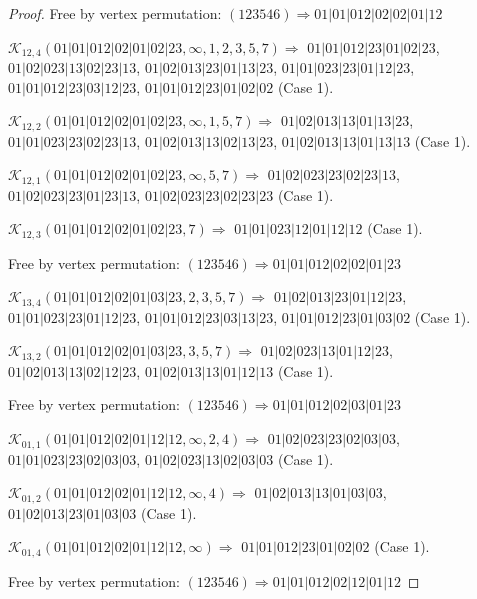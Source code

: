 \documentclass[12pt]{article}
\theoremstyle{plain}
\theoremstyle{definition}
\theoremstyle{remark}
\newcommand{\fancy}[1]{\mathcal{#1}}
\def\K{\fancy{K}}
\begin{document}
\begin{proof}
	
	
	Free by vertex permutation: $(1 2 3 5 4 6)\Rightarrow 01|01|012|02|02|01|12$
	
	
	
	\bigskip
	
	$\K_{12,4}(01|01|012|02|01|02|23,\infty,1, 2, 3, 5, 7)\Rightarrow $ $01|01|012|23|01|02|23$, $01|02|023|13|02|23|13$, $01|02|013|23|01|13|23$, $01|01|023|23|01|12|23$, $01|01|012|23|03|12|23$, $01|01|012|23|01|02|02$ (Case 1).
	
	$\K_{12,2}(01|01|012|02|01|02|23,\infty,1, 5, 7)\Rightarrow $ $01|02|013|13|01|13|23$, $01|01|023|23|02|23|13$, $01|02|013|13|02|13|23$, $01|02|013|13|01|13|13$ (Case 1).
	
	$\K_{12,1}(01|01|012|02|01|02|23,\infty,5, 7)\Rightarrow $ $01|02|023|23|02|23|13$, $01|02|023|23|01|23|13$, $01|02|023|23|02|23|23$ (Case 1).
	
	$\K_{12,3}(01|01|012|02|01|02|23,7)\Rightarrow $ $01|01|023|12|01|12|12$ (Case 1).
	
	
	
	Free by vertex permutation: $(1 2 3 5 4 6)\Rightarrow 01|01|012|02|02|01|23$
	
	
	
	\bigskip
	
	$\K_{13,4}(01|01|012|02|01|03|23,2, 3, 5, 7)\Rightarrow $ $01|02|013|23|01|12|23$, $01|01|023|23|01|12|23$, $01|01|012|23|03|13|23$, $01|01|012|23|01|03|02$ (Case 1).
	
	$\K_{13,2}(01|01|012|02|01|03|23,3, 5, 7)\Rightarrow $ $01|02|023|13|01|12|23$, $01|02|013|13|02|12|23$, $01|02|013|13|01|12|13$ (Case 1).
	
	
	
	Free by vertex permutation: $(1 2 3 5 4 6)\Rightarrow 01|01|012|02|03|01|23$
	
	
	
	\bigskip
	
	$\K_{01,1}(01|01|012|02|01|12|12,\infty,2, 4)\Rightarrow $ $01|02|023|23|02|03|03$, $01|01|023|23|02|03|03$, $01|02|023|13|02|03|03$ (Case 1).
	
	$\K_{01,2}(01|01|012|02|01|12|12,\infty,4)\Rightarrow $ $01|02|013|13|01|03|03$, $01|02|013|23|01|03|03$ (Case 1).
	
	$\K_{01,4}(01|01|012|02|01|12|12,\infty)\Rightarrow $ $01|01|012|23|01|02|02$ (Case 1).
	
	
	
	Free by vertex permutation: $(1 2 3 5 4 6)\Rightarrow 01|01|012|02|12|01|12$
	

\end{proof}
\end{document}
